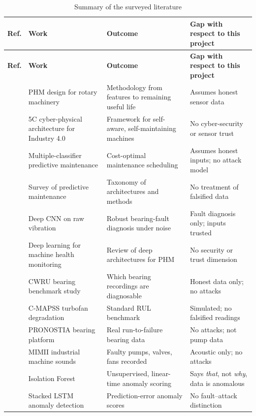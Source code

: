 \clearpage
{\small
\setlength{\LTpre}{0pt}
\begin{longtable}{@{}P{0.9cm} P{4.4cm} P{4.0cm} P{4.0cm}@{}}
\caption{Summary of the surveyed literature}
\label{tab:litsummary}\\
\toprule
\textbf{Ref.} & \textbf{Work} & \textbf{Outcome} & \textbf{Gap with respect to this project} \\
\midrule
\endfirsthead
\toprule
\textbf{Ref.} & \textbf{Work} & \textbf{Outcome} & \textbf{Gap with respect to this project} \\
\midrule
\endhead
\bottomrule
\endfoot
\cite{lee2014phm} & PHM design for rotary machinery & Methodology from features to remaining useful life & Assumes honest sensor data \\
\cite{lee2015cps} & 5C cyber-physical architecture for Industry 4.0 & Framework for self-aware, self-maintaining machines & No cyber-security or sensor trust \\
\cite{susto2015pdm} & Multiple-classifier predictive maintenance & Cost-optimal maintenance scheduling & Assumes honest inputs; no attack model \\
\cite{ran2019pdmsurvey} & Survey of predictive maintenance & Taxonomy of architectures and methods & No treatment of falsified data \\
\cite{zhang2017wdcnn} & Deep CNN on raw vibration & Robust bearing-fault diagnosis under noise & Fault diagnosis only; inputs trusted \\
\cite{zhao2019dlhealth} & Deep learning for machine health monitoring & Review of deep architectures for PHM & No security or trust dimension \\
\cite{smith2015cwru} & CWRU bearing benchmark study & Which bearing recordings are diagnosable & Honest data only; no attacks \\
\cite{saxena2008cmapss} & C-MAPSS turbofan degradation & Standard RUL benchmark & Simulated; no falsified readings \\
\cite{nectoux2012pronostia} & PRONOSTIA bearing platform & Real run-to-failure bearing data & No attacks; not pump data \\
\cite{purohit2019mimii} & MIMII industrial machine sounds & Faulty pumps, valves, fans recorded & Acoustic only; no attacks \\
\cite{liu2008iforest} & Isolation Forest & Unsupervised, linear-time anomaly scoring & Says \emph{that}, not \emph{why}, data is anomalous \\
\cite{malhotra2015lstm} & Stacked LSTM anomaly detection & Prediction-error anomaly scores & No fault--attack distinction \\

\end{longtable}}
